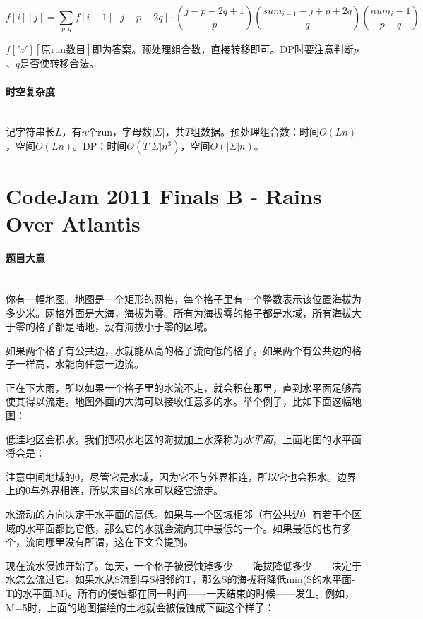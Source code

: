 \documentclass[UTF8]{ctexart}
\newcommand{\myparagraph}[1]{\paragraph{#1}\mbox{}\\}
\theoremstyle{nonumberplain}
\begin{document}
			$$ f[i][j]=\sum_{p,q} f[i-1][j-p-2q] \cdot \binom{j-p-2q+1}{p}\binom{sum_{i-1}-j+p+2q}{q}\binom{num_i-1}{p+q} $$
			
			$f['z'][\mbox{原run数目}]$即为答案。预处理组合数，直接转移即可。DP时要注意判断$p$、$q$是否使转移合法。
		
		\myparagraph{时空复杂度}
		
			记字符串长$L$，有$n$个run，字母数$|\Sigma|$，共$T$组数据。预处理组合数：时间$O(Ln)$，空间$O(Ln)$。DP：时间$O(T |\Sigma| n^3)$，空间$O(|\Sigma| n)$。
	
	\section{CodeJam 2011 Finals B - Rains Over Atlantis}
	
		\myparagraph{题目大意}
		
			你有一幅地图。地图是一个矩形的网格，每个格子里有一个整数表示该位置海拔为多少米。网格外面是大海，海拔为零。所有为海拔零的格子都是水域，所有海拔大于零的格子都是陆地，没有海拔小于零的区域。
		
			如果两个格子有公共边，水就能从高的格子流向低的格子。如果两个有公共边的格子一样高，水能向任意一边流。
		
			正在下大雨，所以如果一个格子里的水流不走，就会积在那里，直到水平面足够高使其得以流走。地图外面的大海可以接收任意多的水。举个例子，比如下面这幅地图：
		
			\begin{center}\end{center}
		
			低洼地区会积水。我们把积水地区的海拔加上水深称为\emph{水平面}，上面地图的水平面将会是：
		
			\begin{center}\end{center}
		
			注意中间地域的0，尽管它是水域，因为它不与外界相连，所以它也会积水。边界上的0与外界相连，所以来自8的水可以经它流走。
		
			水流动的方向决定于水平面的高低。如果与一个区域相邻（有公共边）有若干个区域的水平面都比它低，那么它的水就会流向其中最低的一个。如果最低的也有多个，流向哪里没有所谓，这在下文会提到。
		
			现在流水侵蚀开始了。每天，一个格子被侵蚀掉多少——海拔降低多少——决定于水怎么流过它。如果水从S流到与S相邻的T，那么S的海拔将降低min(S的水平面-T的水平面,M)。所有的侵蚀都在同一时间——一天结束的时候——发生。例如，M=5时，上面的地图描绘的土地就会被侵蚀成下面这个样子：
		
\end{document}
